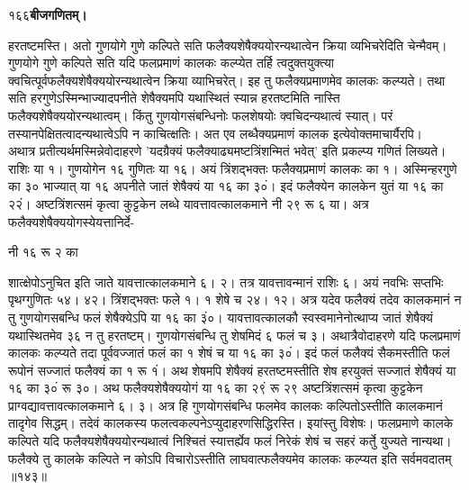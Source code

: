 \documentclass[11pt, openany]{book}
\begin{document}
\onehalfspacing
१६६\hspace{2in}\textbf{बीजगणितम्।} 

\vspace{5mm}

\begin{sloppypar}
\hangindent=0.2in हरतष्टमस्ति। अतो गुणयोगे गुणे कल्पिते सति फलैक्यशेषैक्ययोरन्यथात्वेन क्रिया व्यभिचरेदिति चेन्मैवम्। गुणयोगे गुणे कल्पिते सति यदि फलप्रमाणं कालकः कल्प्येत तर्हि त्वदुक्तयुक्त्या क्वचित्पूर्वफलैक्यशेषैक्ययोरन्यथात्वेन क्रिया व्याभिचरेत्। इह तु फलैक्यप्रमाणमेव कालकः कल्प्यते। तथा सति हरगुणेऽस्मिन्भाज्यादपनीते शेषैक्यमपि यथास्थितं स्यान्न हरतष्टमिति नास्ति फलैक्यशेषैक्ययोरन्यथात्वम्। किंतु गुणयोगसंबन्धिनोः फलशेषयोः क्वचिदन्यथात्वं स्यात्। परं तस्यानपेक्षितत्वादन्यथात्वेऽपि न काचित्क्षतिः। अत एव लब्धैक्यप्रमाणं कालक इत्येवोक्तमाचार्यैरपि।\\

\hangindent=0.2in \hspace{0.2in}अथात्र प्रतीत्यर्थमस्मिन्नेवोदाहरणे 'यदग्रैक्यं फलैक्याढ्यमष्टत्रिंशन्मितं भवेत्' इति प्रकल्प्य गणितं लिख्यते। राशिः या १। गुणयोगेन १६ गुणितः या १६। अयं त्रिंशद्भक्तः फलैक्यप्रमाणं कालकः का १। अस्मिन्हरगुणे का ३० भाज्यात् या १६ अपनीते जातं शेषैक्यं या १६ का ३०ं। इदं फलैक्येन कालकेन युतं या १६ का २२ं। अष्टत्रिंशत्समं कृत्वा कुट्टकेन लब्धे यावत्तावत्कालकमाने नी २९ रू ६ या। अत्र फलैक्यशेषैक्ययोगस्येयत्तानिर्दे-

नी १६ रू २ का

\hangindent=0.2in शात्क्षेपोऽनुचित इति जाते यावत्तात्कालकमाने ६। २। तत्र यावत्तावन्मानं राशिः ६। अयं नवभिः सप्तभिः पृथग्गुणितः ५४। ४२। त्रिंशद्भक्तः फले १। १ शेषे च २४। १२। अत्र यदेव फलैक्यं तदेव कालकमानं न तु गुणयोगसबन्धि फलं शेषैक्येऽपि या १६ का ३ं०। यावत्तावत्कालकौ स्वस्वमानेनोत्थाप्य जातं शेषैक्यं यथास्थितमेव ३६ न तु हरतष्टम्। गुणयोगसंबन्धि तु शेषमिदं ६ फलं च ३। अथात्रैवोदाहरणे यदि फलप्रमाणं कालकः कल्प्यते तदा पूर्ववज्जातं फलं का १ शेषं च या १६ का ३०ं। इदं फलं फलैक्यं सैकमस्तीति फलं रूपोनं सज्जातं फलैक्यं का १ रू १ं। अथ शेषमपि शेषैक्यं हरतष्टमस्तीति शेष हरयुक्तं सज्जातं शेषैक्यं या १६ का ३०ं रू ३०। अथ फलैक्यशेषैक्ययोगं या १६ का २९ं रू २९ अष्टत्रिंशत्समं कृत्वा कुट्टकेन प्राग्वद्यावत्तावत्कालकमाने ६। ३। अत्र हि गुणयोगसंबन्धि फलमेव कालकः कल्पितोऽस्तीति कालकमानं तादृगेव सिद्धम्। तदेवं कालकस्य फलत्वकल्पनेऽप्युदाहरणसिद्धिरस्ति। इयांस्तु विशेषः। फलप्रमाणे कालके कल्पिते यदि फलैक्यशेषैक्ययोरन्यथात्वं निश्चितं स्यात्तर्ह्येव फलं निरेकं शेषं च सहरं कर्तुे युज्यते नान्यथा। फलैक्ये तु कालके कल्पिते न कोऽपि विचारोऽस्तीति लाघवात्फलैक्यमेव कालकः कल्प्यत इति सर्वमवदातम् ॥१४३॥
\end{sloppypar}
\thispagestyle{empty}
\newpage
\end{document}

